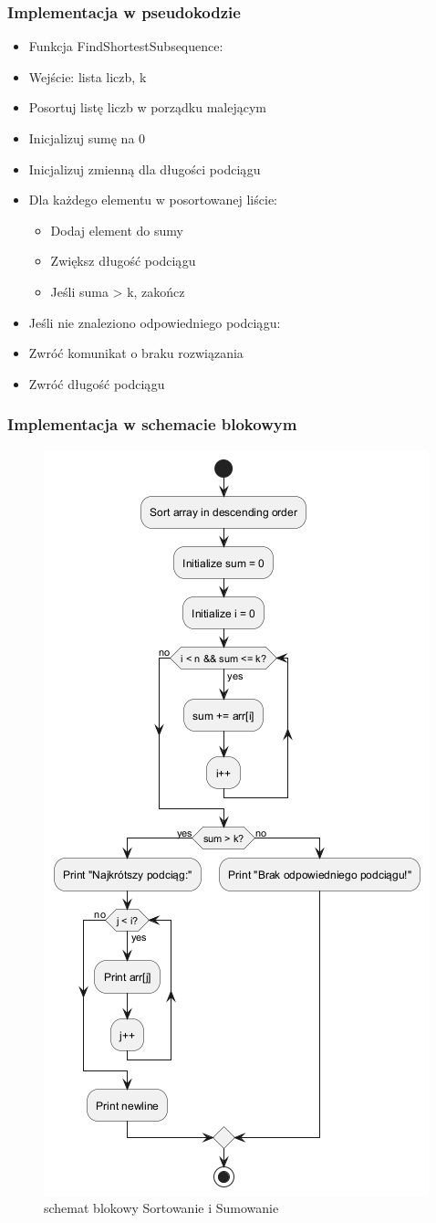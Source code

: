 \documentclass[12pt,twoside]{article}
\begin{document}
\subsubsection{Implementacja w pseudokodzie}

\begin{itemize}
  \item Funkcja FindShortestSubsequence:
  \item Wejście: lista liczb, k
  \item Posortuj listę liczb w porządku malejącym
  \item Inicjalizuj sumę na 0
  \item Inicjalizuj zmienną dla długości podciągu
  \item Dla każdego elementu w posortowanej liście:
  \begin{itemize}
      \item Dodaj element do sumy
      \item Zwiększ długość podciągu
      \item Jeśli suma > k, zakończ
  \end{itemize}
  \item Jeśli nie znaleziono odpowiedniego podciągu:
  \item Zwróć komunikat o braku rozwiązania
  \item Zwróć długość podciągu
\end{itemize}

\subsubsection{Implementacja w schemacie blokowym}

\begin{figure}
    \centering
    \includegraphics[width=0.50\linewidth]{schemat1.png}
    \caption{schemat blokowy Sortowanie i Sumowanie}
\end{figure}
\clearpage
\end{document}
